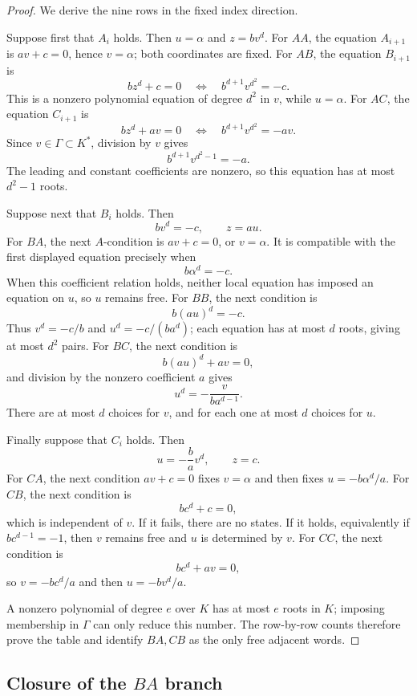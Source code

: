 \documentclass[11pt]{article}
\theoremstyle{definition}
\theoremstyle{remark}
\begin{document}
\begin{proof}
We derive the nine rows in the fixed index direction.

Suppose first that \(A_i\) holds.  Then \(u=\alpha\) and \(z=bv^d\).
For \(AA\), the equation \(A_{i+1}\) is \(av+c=0\), hence
\(v=\alpha\); both coordinates are fixed.  For \(AB\), the equation
\(B_{i+1}\) is
\[
 bz^d+c=0
 \quad\Longleftrightarrow\quad
 b^{d+1}v^{d^2}=-c.
\]
This is a nonzero polynomial equation of degree \(d^2\) in \(v\), while
\(u=\alpha\).  For \(AC\), the equation \(C_{i+1}\) is
\[
 bz^d+av=0
 \quad\Longleftrightarrow\quad
 b^{d+1}v^{d^2}=-av.
\]
Since \(v\in\Gamma\subset K^\ast\), division by \(v\) gives
\[
 b^{d+1}v^{d^2-1}=-a.
\]
The leading and constant coefficients are nonzero, so this equation has at
most \(d^2-1\) roots.

Suppose next that \(B_i\) holds.  Then
\[
 bv^d=-c,\qquad z=au.
\]
For \(BA\), the next \(A\)-condition is \(av+c=0\), or \(v=\alpha\).
It is compatible with the first displayed equation precisely when
\[
 b\alpha^d=-c.
\]
When this coefficient relation holds, neither local equation has imposed an
equation on \(u\), so \(u\) remains free.  For \(BB\), the next condition is
\[
 b(au)^d=-c.
\]
Thus \(v^d=-c/b\) and \(u^d=-c/(ba^d)\); each equation has at most \(d\)
roots, giving at most \(d^2\) pairs.  For \(BC\), the next condition is
\[
 b(au)^d+av=0,
\]
and division by the nonzero coefficient \(a\) gives
\[
 u^d=-\frac{v}{ba^{d-1}}.
\]
There are at most \(d\) choices for \(v\), and for each one at most \(d\)
choices for \(u\).

Finally suppose that \(C_i\) holds.  Then
\[
 u=-\frac ba v^d,\qquad z=c.
\]
For \(CA\), the next condition \(av+c=0\) fixes \(v=\alpha\) and then fixes
\(u=-b\alpha^d/a\).  For \(CB\), the next condition is
\[
 bc^d+c=0,
\]
which is independent of \(v\).  If it fails, there are no states.  If it
holds, equivalently if \(bc^{d-1}=-1\), then \(v\) remains free and \(u\) is
determined by \(v\).  For \(CC\), the next condition is
\[
 bc^d+av=0,
\]
so \(v=-bc^d/a\) and then \(u=-bv^d/a\).

A nonzero polynomial of degree \(e\) over \(K\) has at most \(e\) roots in
\(K\); imposing membership in \(\Gamma\) can only reduce this number.  The
row-by-row counts therefore prove the table and identify \(BA,CB\) as the
only free adjacent words.
\end{proof}

\subsection{Closure of the \(BA\) branch}
\end{document}
